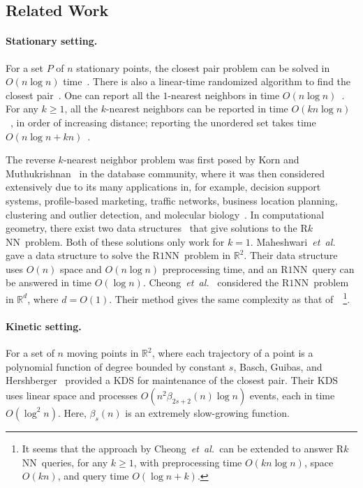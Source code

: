 \documentclass[preprint,12pt]{elsarticle}
\def\rknn{\mbox{R$k$NN}}
\def\r1nn{\mbox{R$1$NN}}
\newcommand{\etal}{\emph{et~al.}}
\begin{document}
\subsection{Related Work}\label{sec:RelatedWork}
\paragraph{Stationary setting.} 
For a set $P$ of $n$ stationary points, the closest pair problem can be solved in $O(n\log n)$ time~\cite{4567872,Bentley:1976:DMS:800113.803652}. There is also a linear-time randomized algorithm to find the closest pair~\cite{FSHJ1078}. One can report all the $1$-nearest neighbors in time $O(n\log n)$~\cite{Vaidya:1989:ONL:70530.70532}. For any $k\geq 1$, all the $k$-nearest neighbors can be reported in time $O(kn\log n)$~\cite{Dickerson:1996:APP:236464.236474}, in order of increasing distance; reporting the unordered set takes time $O(n\log n + kn)$~\cite{Callahan366854,Clarkson:1983:FAN:1382437.1382825,Dickerson:1996:APP:236464.236474}. 


The reverse $k$-nearest neighbor problem was first posed by Korn and Muthukrishnan~\cite{Korn:2000:ISB:342009.335415}  in the database community, where it was then considered extensively due to its many applications in, for example, decision support systems, profile-based marketing, traffic networks, business location planning, clustering and outlier detection, and molecular biology~\cite{Kumar:2008:EAR:1463434.1463483,DBLP:conf/sdm/LinED08}. In computational geometry, there exist two data structures~\cite{MaheshwariVZ02cccg2002,CheongIJCGA2011} that give solutions to the \rknn~problem. Both of these solutions only work for $k=1$. Maheshwari~\etal~\cite{MaheshwariVZ02cccg2002} gave a data structure to solve the \r1nn~problem in $\mathbb{R}^2$. Their data structure uses $O(n)$ space and $O(n\log n)$ preprocessing time, and an \r1nn~query can be answered in time $O(\log n)$. Cheong~\etal~\cite{CheongIJCGA2011} considered the \r1nn~problem in $\mathbb{R}^d$, where $d=O(1)$. Their method gives the same complexity as that of~\cite{MaheshwariVZ02cccg2002}~\footnote{It seems that the approach by Cheong~\etal~can be extended to answer \rknn~queries, for any $k\geq 1$, with preprocessing time $O(kn\log n)$, space $O(kn)$, and query time $O(\log n + k)$.}.

\paragraph{Kinetic setting.}
For a set of $n$ moving points in $\mathbb{R}^2$, where each trajectory of a point is a polynomial function of degree bounded by constant $s$, Basch, Guibas, and Hershberger~\cite{Basch:1997:DSM:314161.314435} provided a KDS for maintenance of the closest pair. Their KDS uses linear space and processes $O(n^2\beta_{2s+2}(n)\log n)$ events, each in time $O(\log^2 n)$. Here, $\beta_s(n)$ is an extremely slow-growing function.
\end{document}
